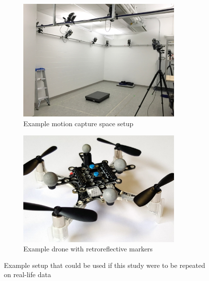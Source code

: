 \documentclass[letterpaper, preprint, paper,11pt]{AAS}	%
\begin{document}
\begin{figure}[htb]
\centering
\begin{subfigure}{.5\textwidth}
	\centering
	\includegraphics[width=0.9\textwidth]{Figures/ViconMotionCaptureSpace}
	\caption{Example motion capture space setup\cite{ViconMotionCaptureSpace}}
	\label{fig:ViconMotionCaptureSpace}
\end{subfigure}%
\begin{subfigure}{.5\textwidth}
	\centering
	\includegraphics[width=0.9\textwidth]{Figures/MotionCaptureDrone}
	\caption{Example drone with retroreflective markers\cite{MotionCaptureDrone}}
	\label{fig:MotionCaptureDrone}
\end{subfigure}
\caption{Example setup that could be used if this study were to be repeated on real-life data}
\label{fig:MotionCaptureExample}
\end{figure}
\end{document}
